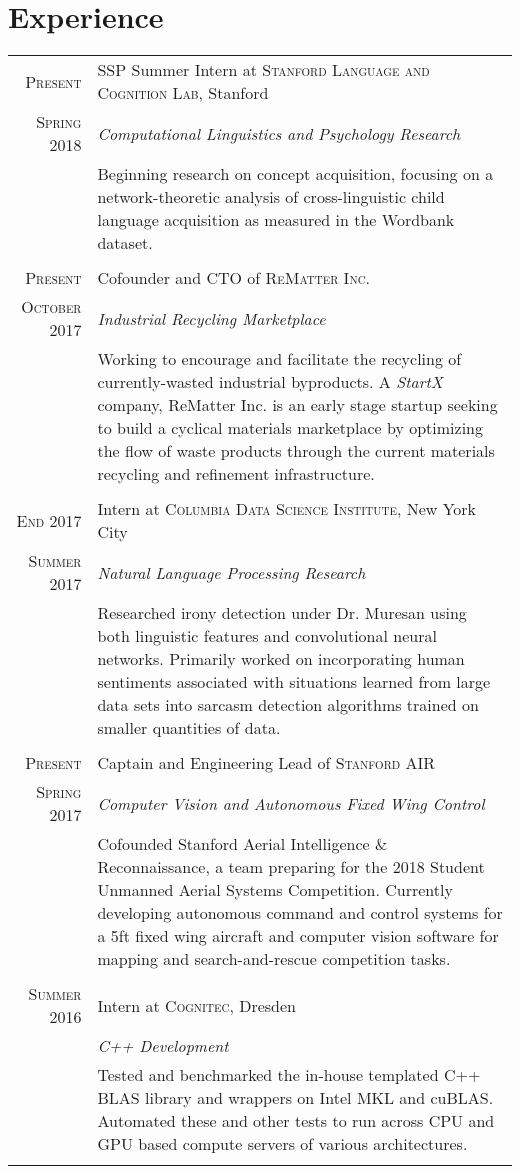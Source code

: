 \documentclass[letterpaper,10pt]{article}
\begin{document}
\section{Experience}
\begin{tabular}[t]{r|p{13.3cm}}
\textsc{Present}  & SSP Summer Intern at \textsc{Stanford Language and Cognition Lab}, Stanford \\ \textsc{Spring 2018} &\emph{Computational Linguistics and Psychology Research}\\&\footnotesize{Beginning research on concept acquisition, focusing on a network-theoretic analysis of cross-linguistic child language acquisition as measured in the Wordbank dataset.}\\\multicolumn{2}{c}{}\\
\textsc{Present}  & Cofounder and CTO of \textsc{ReMatter Inc.} \\ \textsc{October 2017} &\emph{Industrial Recycling Marketplace}\\&\footnotesize{Working to encourage and facilitate the recycling of currently-wasted industrial byproducts. A \emph{StartX} company, ReMatter Inc. is an early stage startup seeking to build a cyclical materials marketplace by optimizing the flow of waste products through the current materials recycling and refinement infrastructure.}\\\multicolumn{2}{c}{}\\
\textsc{End 2017}  & Intern at \textsc{Columbia Data Science Institute}, New York City \\ \textsc{Summer 2017} &\emph{Natural Language Processing Research}\\&\footnotesize{Researched irony detection under Dr. Muresan using both linguistic features and convolutional neural networks. Primarily worked on incorporating human sentiments associated with situations learned from large data sets into sarcasm detection algorithms trained on smaller quantities of data.}\\\multicolumn{2}{c}{}\\
\textsc{Present}  & Captain and Engineering Lead of \textsc{Stanford AIR} \\ \textsc{Spring 2017} &\emph{Computer Vision and Autonomous Fixed Wing Control}\\&\footnotesize{Cofounded Stanford Aerial Intelligence \& Reconnaissance, a team preparing for the 2018 Student Unmanned Aerial Systems Competition. Currently developing autonomous command and control systems for a 5ft fixed wing aircraft and computer vision software for mapping and search-and-rescue competition tasks.}\\\multicolumn{2}{c}{}\\
 \textsc{Summer 2016} & Intern at \textsc{Cognitec}, Dresden \\&\emph{C++ Development}\\&\footnotesize{Tested and benchmarked the in-house templated C++ BLAS library and wrappers on Intel MKL and cuBLAS. Automated these and other tests to run across CPU and GPU based compute servers of various architectures.}\\\multicolumn{2}{c}{}\\
 

\end{tabular}
\end{document}
